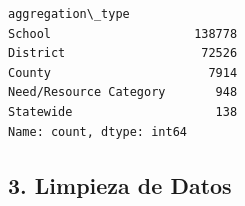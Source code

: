 \documentclass[11pt]{article}
\makeatletter
\newcommand{\boxspacing}{\kern\kvtcb@left@rule\kern\kvtcb@boxsep}
\newcommand{\prompt}[4]{
        {\ttfamily\llap{{\color{#2}[#3]:\hspace{3pt}#4}}\vspace{-\baselineskip}}
    }
\makeatother
\begin{document}
            \begin{tcolorbox}[breakable, size=fbox, boxrule=.5pt, pad at break*=1mm, opacityfill=0]
\prompt{Out}{outcolor}{6}{\boxspacing}
\begin{Verbatim}[commandchars=\\\{\}]
aggregation\_type
School                    138778
District                   72526
County                      7914
Need/Resource Category       948
Statewide                    138
Name: count, dtype: int64
\end{Verbatim}
\end{tcolorbox}
        
    \subsection{3. Limpieza de Datos}\label{limpieza-de-datos}
\end{document}
